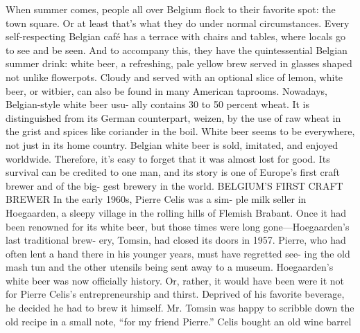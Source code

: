 \documentclass[a4paper,parskip=half]{scrartcl}
\begin{document}
\parencite[45]{Mulder2020}
When summer comes, people
all over Belgium flock to
their favorite spot: the town
square. Or at least that’s
what they do under normal circumstances.
Every self-respecting Belgian café has a
terrace with chairs and tables, where locals
go to see and be seen. And to accompany
this, they have the quintessential Belgian
summer drink: white beer, a refreshing,
pale yellow brew served in glasses shaped
not unlike flowerpots. Cloudy and served
with an optional slice of lemon, white
beer, or witbier, can also be found in many
American taprooms.
Nowadays, Belgian-style white beer usu-
ally contains 30 to 50 percent wheat. It is
distinguished from its German counterpart,
weizen, by the use of raw wheat in the
grist and spices like coriander in the boil.
White beer seems to be everywhere, not
just in its home country. Belgian white beer
is sold, imitated, and enjoyed worldwide.
Therefore, it’s easy to forget that it was
almost lost for good. Its survival can be
credited to one man, and its story is one of
Europe’s first craft brewer and of the big-
gest brewery in the world.
BELGIUM’S FIRST
CRAFT BREWER
In the early 1960s, Pierre Celis was a sim-
ple milk seller in Hoegaarden, a sleepy
village in the rolling hills of Flemish
Brabant. Once it had been renowned for
its white beer, but those times were long
gone—Hoegaarden’s last traditional brew-
ery, Tomsin, had closed its doors in 1957.
Pierre, who had often lent a hand there in
his younger years, must have regretted see-
ing the old mash tun and the other utensils
being sent away to a museum. Hoegaarden’s
white beer was now officially history.
Or, rather, it would have been were it
not for Pierre Celis’s entrepreneurship and
thirst. Deprived of his favorite beverage,
he decided he had to brew it himself. Mr.
Tomsin was happy to scribble down the
old recipe in a small note, “for my friend
Pierre.” Celis bought an old wine barrel
\end{document}
